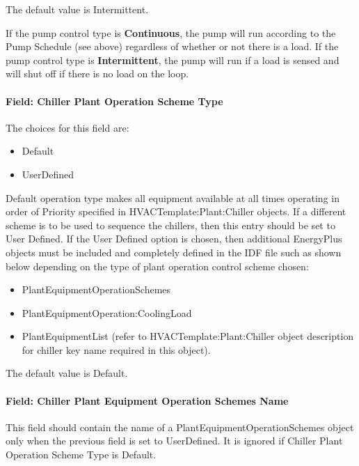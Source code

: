 The default value is Intermittent.

If the pump control type is \textbf{Continuous}, the pump will run according to the Pump Schedule (see above) regardless of whether or not there is a load. If the pump control type is \textbf{Intermittent}, the pump will run if a load is sensed and will shut off if there is no load on the loop.

\paragraph{Field: Chiller Plant Operation Scheme Type}\label{field-chiller-plant-operation-scheme-type}

The choices for this field are:

\begin{itemize}
\item
  Default
\item
  UserDefined
\end{itemize}

Default operation type makes all equipment available at all times operating in order of Priority specified in HVACTemplate:Plant:Chiller objects. If a different scheme is to be used to sequence the chillers, then this entry should be set to User Defined. If the User Defined option is chosen, then additional EnergyPlus objects must be included and completely defined in the IDF file such as shown below depending on the type of plant operation control scheme chosen:

\begin{itemize}
\item
  PlantEquipmentOperationSchemes
\item
  PlantEquipmentOperation:CoolingLoad
\item
  PlantEquipmentList (refer to HVACTemplate:Plant:Chiller object description for chiller key name required in this object).
\end{itemize}

The default value is Default.

\paragraph{Field: Chiller Plant Equipment Operation Schemes Name}\label{field-chiller-plant-equipment-operation-schemes-name}

This field should contain the name of a PlantEquipmentOperationSchemes object only when the previous field is set to UserDefined. It is ignored if Chiller Plant Operation Scheme Type is Default.

